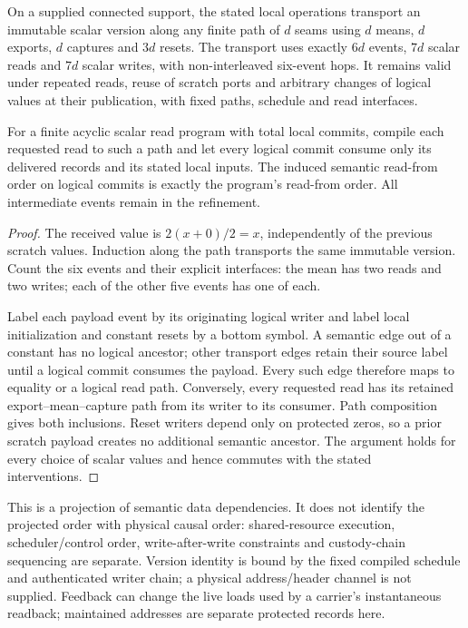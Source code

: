 \begin{theorem}
\label{thm:source-feedback-transport}
On a supplied connected support, the stated local operations transport an
immutable scalar version along any finite path of $d$ seams using $d$ means,
$d$ exports, $d$ captures and $3d$ resets. The transport uses exactly $6d$
events, $7d$ scalar reads and $7d$ scalar writes, with non-interleaved
six-event hops. It remains valid under
repeated reads, reuse of scratch ports and arbitrary changes of logical
values at their publication, with fixed paths, schedule and read interfaces.

For a finite acyclic scalar read program with total local commits,
compile each requested read to
such a path and let every logical commit consume only its delivered records
and its stated local inputs. The induced semantic read-from order on logical
commits is exactly the program's read-from order. All intermediate events
remain in the refinement.
\end{theorem}
\begin{proof}
The received value is $2(x+0)/2=x$, independently of the previous scratch
values. Induction along the path transports the same immutable version.
Count the six events and their explicit interfaces: the mean has two reads
and two writes; each of the other five events has one of each.

Label each payload event by its originating logical writer and label local
initialization and constant resets by a bottom symbol. A semantic edge out
of a constant has no logical ancestor; other transport edges retain their
source label until a logical commit consumes the payload. Every such edge
therefore maps to equality or a logical read path. Conversely, every
requested read has its retained export--mean--capture path from its writer
to its consumer. Path composition gives both inclusions. Reset writers
depend only on protected zeros, so a prior scratch payload creates no
additional semantic ancestor. The argument holds for every choice of scalar
values and hence commutes with the stated interventions.
\end{proof}

This is a projection of semantic data dependencies. It does not identify
the projected order with physical causal order: shared-resource execution,
scheduler/control order, write-after-write constraints and custody-chain
sequencing are separate.
Version identity is bound by the fixed compiled schedule and authenticated
writer chain; a physical address/header channel is not supplied.
Feedback can change the live loads used by a carrier's instantaneous
readback; maintained addresses are separate protected records here.

